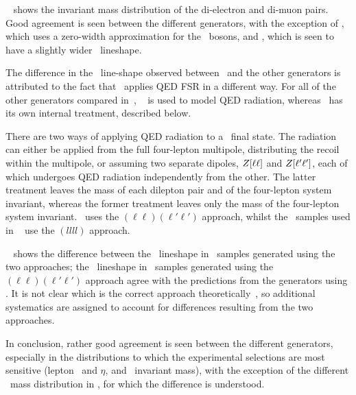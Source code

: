 
~ shows the invariant mass distribution of the di-electron and
di-muon pairs. Good agreement is seen between the different generators, with
the exception of \mcatnlo, which uses a zero-width approximation for the \Z\
bosons, and \sherpa, which is seen to have a slightly wider \Z\ lineshape.

The difference in the \Z\ line-shape observed between \sherpa\ and the other
generators is attributed to the fact that \sherpa\ applies QED FSR in a
different way. For all of the other generators compared in~, 
\photos~\cite{Golonka:2005pn} is used
to model QED radiation, whereas \sherpa\ has its own internal treatment,
described below.

There are two
ways of applying QED radiation to a \ZZllll\ final state. The radiation can
either be applied from the full four-lepton multipole, distributing the recoil within
the multipole, or assuming two separate dipoles, $Z[\ell\ell]$ and
$Z[\ell'\ell']$, each
of which undergoes QED radiation independently from the other. The latter
treatment leaves the mass of each dilepton pair and of the four-lepton system invariant, whereas the former
treatment leaves only the mass of the four-lepton system invariant. \photos\ uses the
$(\ell\ell)(\ell'\ell')$ approach, whilst the \sherpa\ samples used in
~\fig{gen-comp-mZ}
use the $(llll)$ approach. 

~ shows the difference 
between the \Z\
lineshape in \sherpa\ samples generated using the two approaches; the \Z\
lineshape in \sherpa\ samples generated using the $(\ell\ell)(\ell'\ell')$ approach agree with the predictions from the generators using \photos. It is not  clear which is the correct approach
theoretically~\cite{Siegert}, so additional systematics are assigned to account
for differences resulting from the two approaches.

In conclusion, rather good agreement is seen between the different generators,
especially in the distributions to which the experimental selections are most
sensitive (lepton \pt\ and $\eta$, and \dilep\ invariant mass), with the exception
of the different \dilep\ mass distribution in \sherpa, for which the difference
is understood.

